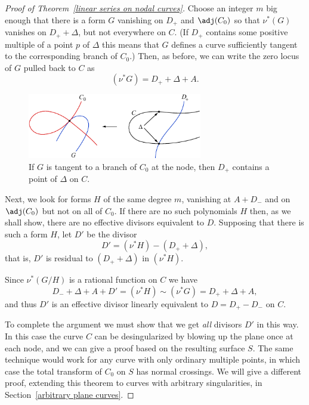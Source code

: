 \begin{proof}[Proof of Theorem~\ref{linear series on nodal curves}]
 Choose an integer $m$ 
big enough
that there is a form $G$ vanishing
 on  $D_{+}$ and $\adj(C_{0})$ so that
 $\nu^{*}(G)$ vanishes on $D_{+}+\Delta$, but not everywhere on $C$.
 (If $D_{+}$ contains some positive multiple of a point $p$ of $\Delta$
 this means that $G$ defines
 a curve sufficiently tangent to the corresponding branch of $C_0$.)
Then, as before,
we can write the zero locus of $G$ pulled back to $C$ as
$$
(\nu^*G) = D_{+} + \Delta + A.
$$

\begin{figure}
\centerline {\includegraphics[width=3.0in]{"main/Fig14-3"}}
\caption{If $G$ is tangent to a branch of $C_{0}$ at the node, then
$D_{+}$ contains
a point of $\Delta$ on $C$.}
\label{Fig14.2}
\end{figure}

Next, we look for forms $H$ of the same degree $m$, vanishing at $A+D_{-}$
and on $\adj(C_{0})$
 but not on all of $C_0$. If there are no such polynomials $H$ then,
 as we shall show,
there are no effective divisors equivalent to $D$. Supposing that there
is such a form $H$, let $D'$ be the divisor
$$
D' = (\nu^*H) -( D_{+} + \Delta),
$$
that is, $D'$ is residual to $( D_{+} + \Delta)$ in $(\nu^*H)$.

Since $\nu^*(G/H)$ is a rational function on $C$ we have
$$
D_{-} +\Delta + A+ D' = (\nu^*H) \sim (\nu^*G) = D_{+} + \Delta + A,
$$
and thus $D'$ is an effective divisor linearly equivalent to $D =
D_{+}-D_{-}$ on $C$.

To complete the argument we must show that we get \emph{all} divisors $D'$
in this way.
In this case the curve $C$ can be desingularized by blowing up the plane
once at each node,
and we can give a proof based on the resulting surface $S$. The same
technique would work for any curve with only
%
%
%
ordinary multiple points, in which case the total transform of $C_{0}$ on
$S$ has normal crossings. We will give a different proof, extending this
theorem to curves with arbitrary singularities, in Section~\ref{arbitrary
plane curves}.


\end{proof}
